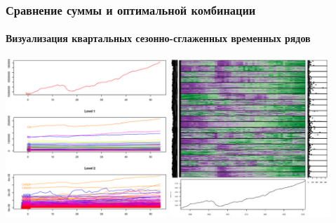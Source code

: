 \documentclass[c, dvipsnames]{beamer}  %
\begin{document}
\begin{frame}[shrink=5]
\frametitle{Сравнение суммы и оптимальной комбинации } 
\framesubtitle{Визуализация  квартальных сезонно-сглаженных временных рядов   }

\vfil
\hfil\hfil\includegraphics[height=6cm]{screenshot064}\hfil\hfil
\includegraphics[height=6cm]{screenshot065}\newline
\null\hfil\hfil{}
\hfil\hfil{}
\end{frame}
\end{document}
